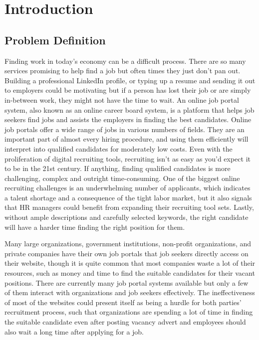 \section{Introduction}

\subsection{Problem Definition}

\par Finding work in today’s economy can be a difficult process. There are so many services promising to help find a job but often times they just don’t pan out.  Building a professional LinkedIn profile, or typing up a resume and sending it out to employers could be motivating but if a person has lost their job or are simply in-between work, they might not have the time to wait. An online job portal system, also known as an online career board system, is a platform that helps job seekers find jobs and assists the employers in finding the best candidates. Online job portals offer a wide range of jobs in various numbers of fields. They are an important part of almost every hiring procedure, and using them efficiently will interpret into qualified candidates for moderately low costs. Even with the proliferation of digital recruiting tools, recruiting isn’t as easy as you’d expect it to be in the 21st century. If anything, finding qualified candidates is more challenging, complex and outright time-consuming. One of the biggest online recruiting challenges is an underwhelming number of applicants, which indicates a talent shortage and a consequence of the tight labor market, but it also signals that HR managers could benefit from expanding their recruiting tool sets. Lastly, without ample descriptions and carefully selected keywords, the right candidate will have a harder time finding the right position for them.

Many large organizations, government institutions, non-profit organizations, and private companies have their own job portals that job seekers directly access on their website, though it is quite common that most companies waste a lot of their resources, such as money and time to find the suitable candidates for their vacant positions. There are currently many job portal systems available but only a few of them interact with organizations and job seekers effectively. The ineffectiveness of most of the websites could present itself as being a hurdle for both parties’ recruitment process, such that organizations are spending a lot of time in finding the suitable candidate even after posting vacancy advert and employees should also wait a long time after applying for a job.

